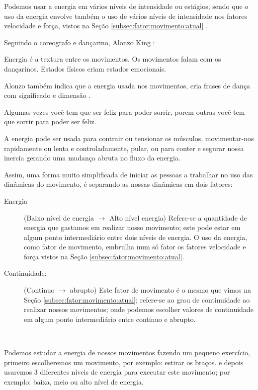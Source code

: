 Podemos usar a energia em vários níveis de intensidade ou estágios,
sendo que o uso da energia envolve também o uso de vários níveis de intensidade 
nos fatores velocidade e força, vistos na Seção  \ref{subsec:fator:movimento:atual} \cite[pp. 99]{sofras2019dance}.

Seguindo o coreografo e dançarino, Alonzo King \cite[pp. 99, 100]{sofras2019dance}:
\begin{citando}%
Energia é a textura entre os movimentos.
Os movimentos falam com os dançarinos.
Estados físicos criam estados emocionais.
\end{citando}
Alonzo também indica que a energia usada nos movimentos,
 cria frases de dança com significado e dimensão \cite[pp. 99]{sofras2019dance}.

\begin{FraseFernandoPR}
Algumas vezes você tem que ser feliz para poder sorrir,
porem outras você tem que sorrir para poder ser feliz. %
\end{FraseFernandoPR}

A energia pode ser usada para contrair ou tensionar os músculos,
movimentar-nos rapidamente ou lenta e controladamente, pular, 
ou para conter e segurar nossa inercia gerando uma mudança abruta no fluxo da energia.

Assim, 
uma forma muito simplificada de iniciar as pessoas a trabalhar no uso das dinâmicas do movimento,
é separando as nossas dinâmicas em dois fatores:
\begin{description}
\item[Energia] (Baixo nível de energia $\rightarrow$ Alto nível energia)
Refere-se a quantidade de energia que gastamos em realizar nosso movimento;
este pode estar em algum ponto intermediário entre dois níveis de energia. 
O uso da energia, como fator de movimento, embrulha num só fator os 
fatores velocidade e força vistos na Seção  \ref{subsec:fator:movimento:atual}.
\item[Continuidade:] (Continuo $\rightarrow$ abrupto)
Este fator de movimento é o mesmo que vimos na Seção \ref{subsec:fator:movimento:atual};
refere-se ao grau de continuidade ao realizar nossos movimentos;
onde podemos escolher valores de continuidade em algum ponto intermediário entre continuo e abrupto.
\end{description}~

\begin{example}
Podemos estudar a energia de nossos movimentos fazendo um pequeno exercício,
primeiro escolheremos um movimento, por exemplo: estirar os braços.
e depois usaremos 3 diferentes níveis de energia para executar este movimento;
por exemplo: baixa, meio ou alto nível de energia.
\end{example}

